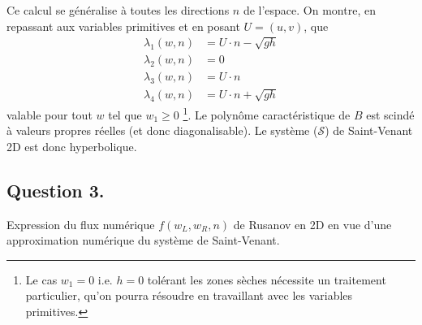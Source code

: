\documentclass[
	french,
	11pt, %
]{fphw}
\begin{document}
Ce calcul se généralise à toutes les directions $n$ de l'espace. On montre, en repassant aux variables primitives et en posant $U = (u,v)$, que 
\begin{align*}
	\lambda_1(w,n) &= U\cdot n - \sqrt{gh} \\
	\lambda_2(w,n) &= 0 \\
	\lambda_3(w,n) &= U\cdot n \\
	\lambda_4(w,n) &= U\cdot n + \sqrt{gh}
\end{align*}
valable pour tout $w$ tel que $w_1 \geq 0$ \footnote{Le cas $w_1 = 0$ i.e. $h=0$ tolérant les zones sèches nécessite un traitement particulier, qu'on pourra résoudre en travaillant avec les variables primitives.}. Le polynôme caractéristique de $B$ est scindé à valeurs propres réelles (et donc diagonalisable). Le système ($\mathcal{S}$) de Saint-Venant 2D est donc hyperbolique.


\subsection*{Question 3.}

\begin{problem}
	Expression du flux numérique $f(w_L, w_R, n)$ de Rusanov en 2D en vue d'une approximation numérique du système de Saint-Venant.
\end{problem}
\end{document}
